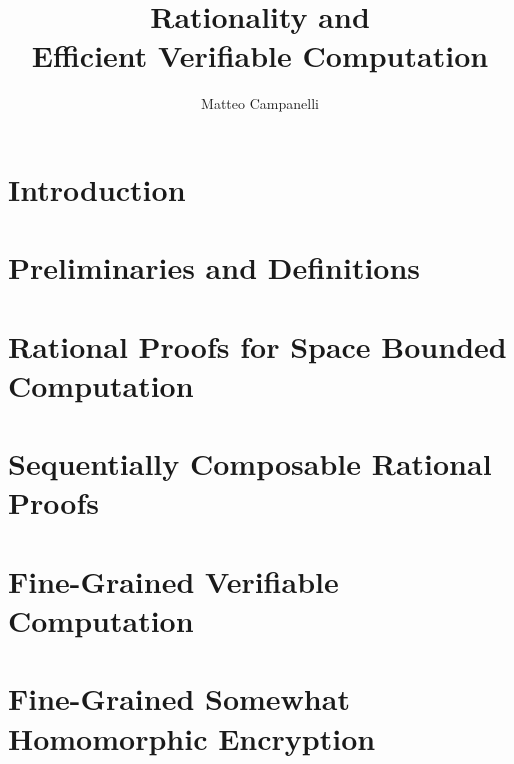 \documentclass[nobib]{tufte-book}
\title{Rationality and \\ \noindent Efficient Verifiable Computation}
\author{Matteo Campanelli}
\date{}
\begin{document}
\maketitle


\tableofcontents





\chapter{Introduction}




\chapter{Preliminaries and  Definitions}




\chapter{Rational Proofs for Space Bounded Computation}




\chapter{Sequentially Composable Rational Proofs}



\chapter{Fine-Grained Verifiable Computation}


\chapter{Fine-Grained Somewhat Homomorphic Encryption}







\end{document}
